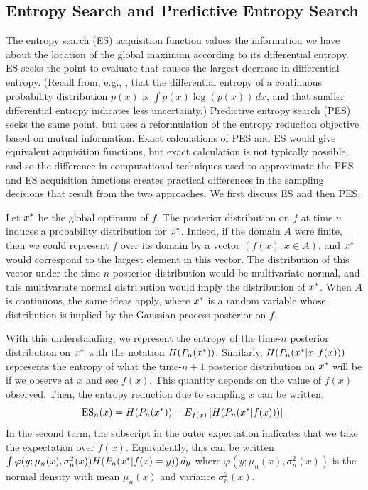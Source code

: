\documentclass{article}
\begin{document}
\subsection{Entropy Search and Predictive Entropy Search}
\label{sec:EntropySearch}
The entropy search (ES) \citep{hennig2012entropy} acquisition function values the information we have about the location of the global maximum according to its differential entropy.  
ES seeks the point to evaluate that causes the largest decrease in differential entropy.  
(Recall from, e.g., \cite{cover2012elements},
that the differential entropy of a continuous probability distribution $p(x)$ is $\int p(x) \log(p(x))\, dx$, and that smaller differential entropy indicates less uncertainty.)
Predictive entropy search (PES) \citep{hernandez2014predictive} seeks the same point, but uses a reformulation of the entropy reduction objective based on mutual information.  Exact calculations of PES and ES would give equivalent acquisition functions, but exact calculation is not typically possible, and so the difference in computational techniques used to approximate the PES and ES acquisition functions creates practical differences in the sampling decisions that result from the two approaches.  We first discuss ES and then PES.

Let $x^*$ be the global optimum of $f$.  The posterior distribution on $f$ at time $n$ induces a probability distribution for $x^*$.  Indeed, if the domain $A$ were finite, then we could represent $f$ over its domain by a vector $(f(x) : x \in A)$, and $x^*$ would correspond to the largest element in this vector.  The distribution of this vector under the time-$n$ posterior distribution would be multivariate normal, and this multivariate normal distribution would imply the distribution of $x^*$.  When $A$ is continuous, the same ideas apply, where $x^*$ is a random variable whose distribution is implied by the Gaussian process posterior on $f$.

With this understanding, we represent the entropy of the time-$n$ posterior distribution on $x^*$ with the notation 
$H(P_n(x^*))$.  Similarly, $H(P_n(x^* | x,f(x)))$ represents the entropy of what the time-$n+1$ posterior distribution on $x^*$ will be if we observe at $x$ and see $f(x)$.  This quantity depends on the value of $f(x)$ observed.
Then, the entropy reduction due to sampling $x$ can be written,
\begin{equation}
\mathrm{ES}_n(x) = H(P_n(x^*)) - E_{f(x)}\left[H(P_n(x^* | f(x)))\right].
\label{eq:ES}
\end{equation}
In the second term, the subscript in the outer expectation indicates that we take the expectation over $f(x)$.  Equivalently, this can be written $\int \varphi(y; \mu_n(x), \sigma_n^2(x)) H(P_n(x^* | f(x)=y))\, dy$ where $\varphi(y; \mu_n(x), \sigma_n^2(x))$ is the normal density with mean $\mu_n(x)$ and variance $\sigma_n^2(x)$.
\end{document}
